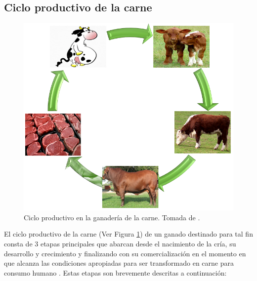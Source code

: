 \subsection{Ciclo productivo de la carne}

\begin{figure}[H]
\begin{center}
\includegraphics[scale=0.55]{img/ganadcarne.png}
\end{center}
\caption{Ciclo productivo en la ganadería de la carne.  Tomada de \cite{contextoganadero}. \label{ganadcarnepng}}
\end{figure}

 
El ciclo productivo de la carne (Ver Figura \ref{ganadcarnepng})  de un ganado destinado para tal fin consta de 3 etapas principales que abarcan desde el nacimiento de la cría, su desarrollo y crecimiento y finalizando con su comercialización en el momento en que alcanza las condiciones apropiadas para ser transformado en carne para consumo humano \cite{mahecha}. Estas etapas son brevemente descritas a continuación:



